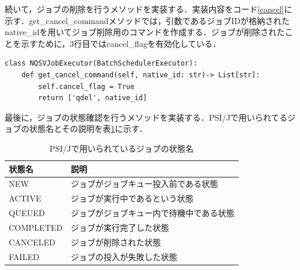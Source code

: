 続いて，ジョブの削除を行うメソッドを実装する．実装内容をコード\ref{cancel}に示す．get\_cancel\_commandメソッドでは，引数であるジョブIDが格納されたnative\_idを用いてジョブ削除用のコマンドを作成する．ジョブが削除されたことを示すために，3行目ではcancel\_flagを有効化している．\par

\begin{lstlisting}[caption=ジョブの削除メソッド, label=cancel]
class NQSVJobExecutor(BatchSchedulerExecutor):    
    def get_cancel_command(self, native_id: str)-> List[str]:
        self.cancel_flag = True
        return ['qdel', native_id]
\end{lstlisting}

最後に，ジョブの状態確認を行うメソッドを実装する．PSI/Jで用いられてるジョブの状態名とその説明を表\ref{PSIJstatus}に示す．\par

\begin{table}[tb]
    \centering
    \caption{PSI/Jで用いられているジョブの状態名}
    \begin{tabular}{|l|l|}
    \hline
    状態名       & 説明                  \\ \hline
    NEW       & ジョブがジョブキュー投入前である状態     \\ \hline
    ACTIVE    & ジョブが実行中であるという状態     \\ \hline
    QUEUED    & ジョブがジョブキュー内で待機中である状態 \\ \hline
    COMPLETED & ジョブが実行完了した状態        \\ \hline
    CANCELED  & ジョブが削除された状態         \\ \hline
    FAILED    & ジョブの投入が失敗した状態       \\ \hline
    \end{tabular}
    \label{PSIJstatus}
\end{table}

